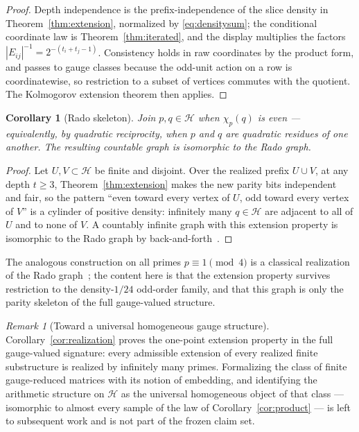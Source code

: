 \documentclass[11pt]{article}
\newtheorem{corollary}[theorem]{Corollary}
\theoremstyle{definition}
\theoremstyle{remark}
\newtheorem{remark}[theorem]{Remark}
\begin{document}
\begin{proof}
Depth independence is the prefix-independence of the slice density in
Theorem~\ref{thm:extension}, normalized by \eqref{eq:densitysum}; the
conditional coordinate law is Theorem~\ref{thm:iterated}, and the display
multiplies the factors $|E_{ij}|^{-1}=2^{-(t_i+t_j-1)}$.  Consistency
holds in raw coordinates by the product form, and passes to gauge classes
because the odd-unit action on a row is coordinatewise, so restriction to
a subset of vertices commutes with the quotient.  The Kolmogorov
extension theorem then applies.
\end{proof}

\begin{corollary}[Rado skeleton]\label{cor:rado}
Join $p,q\in\mathcal H$ when $\chi_p(q)$ is even --- equivalently, by
quadratic reciprocity, when $p$ and $q$ are quadratic residues of one
another.  The resulting countable graph is isomorphic to the Rado graph.
\end{corollary}

\begin{proof}
Let $U,V\subset\mathcal H$ be finite and disjoint.  Over the realized
prefix $U\cup V$, at any depth $t\ge3$, Theorem~\ref{thm:extension} makes
the new parity bits independent and fair, so the pattern ``even toward
every vertex of $U$, odd toward every vertex of $V$'' is a cylinder of
positive density: infinitely many $q\in\mathcal H$ are adjacent to all of
$U$ and to none of $V$.  A countably infinite graph with this extension
property is isomorphic to the Rado graph by
back-and-forth~\cite{Cameron}.
\end{proof}

The analogous construction on all primes $p\equiv1\pmod4$ is a classical
realization of the Rado graph~\cite{Cameron}; the content here is that
the extension property survives restriction to the density-$1/24$
odd-order family, and that this graph is only the parity skeleton of the
full gauge-valued structure.

\begin{remark}[Toward a universal homogeneous gauge structure]
\label{rem:fraisse}
Corollary~\ref{cor:realization} proves the one-point extension property
in the full gauge-valued signature: every admissible extension of every
realized finite substructure is realized by infinitely many primes.
Formalizing the class of finite gauge-reduced matrices with its notion of
embedding, and identifying the arithmetic structure on $\mathcal H$ as
the universal homogeneous object of that class --- isomorphic to almost
every sample of the law of Corollary~\ref{cor:product} --- is left to
subsequent work and is not part of the frozen claim set.
\end{remark}
\end{document}

